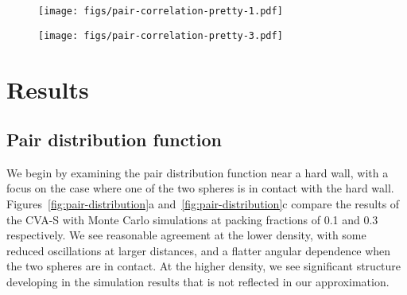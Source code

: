 \documentclass[letterpaper,twocolumn,amsmath,amssymb,pre,aps,10pt]{revtex4-1}
\newcommand{\rr}{\textbf{r}}
\begin{document}
\begin{figure*}
  \begin{subfigure}{\textwidth}
    \texttt{[image: figs/pair-correlation-pretty-1.pdf]}
    \vspace{-0.6cm}
  \end{subfigure}
  \begin{subfigure}{\textwidth}
    \texttt{[image: figs/pair-correlation-pretty-3.pdf]}
    \vspace{-0.6cm}
  \end{subfigure}
  \caption{The pair distribution function near a hard wall, with
    packing fractions of 0.1 and 0.3 and $\rr_1$ in contact with the
    hard wall.  On the left are 2D plots of $g^{(2)}(\rr_1,\rr_2)$ as
    $\rr_2$ varies. \plotcomp{$g^{(2)}(\rr_1,\rr_2)$}.}
  \label{fig:pair-distribution}
\end{figure*}
\section{Results}

\subsection{Pair distribution function}


We begin by examining the pair distribution function near a hard wall,
with a focus on the case where one of the two spheres is in contact
with the hard wall.  Figures~\ref{fig:pair-distribution}a
and~\ref{fig:pair-distribution}c compare the results of the CVA-S with
Monte Carlo simulations at packing fractions of 0.1 and 0.3
respectively. We see reasonable agreement at the lower density, with
some reduced oscillations at larger distances, and a flatter angular
dependence when the two spheres are in contact.  At the higher
density, we see significant structure developing in the simulation
results that is not reflected in our approximation.
\end{document}
